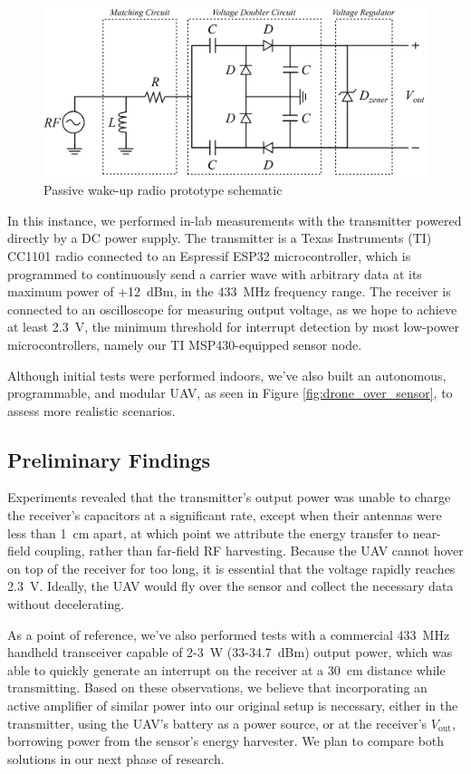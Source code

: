 \documentclass[conference]{IEEEtran}
\begin{document}
\begin{figure}[htbp]
  \centerline{\includegraphics[width=1\linewidth]{receiver.png}}
  \caption{Passive wake-up radio prototype schematic}
  \label{fig:receiver}
\end{figure}

In this instance, we performed in-lab measurements with the transmitter powered directly by a DC power supply. The transmitter is a Texas Instruments (TI) CC1101 radio connected to an Espressif ESP32 microcontroller, which is programmed to continuously send a carrier wave with arbitrary data at its maximum power of +12~dBm, in the 433~MHz frequency range. The receiver is connected to an oscilloscope for measuring output voltage, as we hope to achieve at least 2.3~V, the minimum threshold for interrupt detection by most low-power microcontrollers, namely our TI MSP430-equipped sensor node.

Although initial tests were performed indoors, we've also built an autonomous, programmable, and modular UAV, as seen in Figure \ref{fig:drone_over_sensor}, to assess more realistic scenarios.

\subsection{Preliminary Findings}

Experiments revealed that the transmitter's output power was unable to charge the receiver's capacitors at a significant rate, except when their antennas were less than 1~cm apart, at which point we attribute the energy transfer to near-field coupling, rather than far-field RF harvesting. Because the UAV cannot hover on top of the receiver for too long, it is essential that the voltage rapidly reaches 2.3~V. Ideally, the UAV would fly over the sensor and collect the necessary data without decelerating.

As a point of reference, we've also performed tests with a commercial 433~MHz handheld transceiver capable of 2-3~W (33-34.7~dBm) output power, which was able to quickly generate an interrupt on the receiver at a 30~cm distance while transmitting. Based on these observations, we believe that incorporating an active amplifier of similar power into our original setup is necessary, either in the transmitter, using the UAV's battery as a power source, or at the receiver's $V_{\text{out}}$, borrowing power from the sensor's energy harvester. We plan to compare both solutions in our next phase of research.
\end{document}
